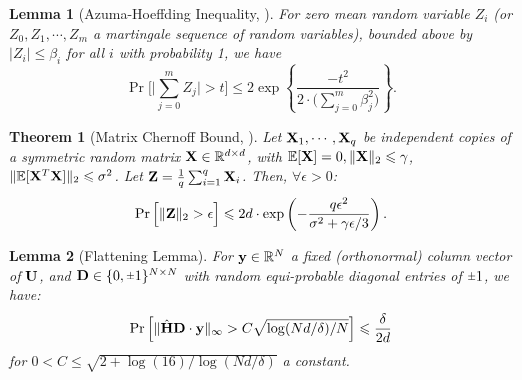 \documentclass[journal,letterpaper,onecolumn,twoside,nofonttune]{IEEEtran}
\newcommand{\Ub}{\bold{U}}
\newcommand{\Xb}{\bold{X}}
\newcommand{\yb}{\bold{y}}
\newcommand{\Zb}{\bold{Z}}
\newcommand{\R}{\mathbb{R}}
\newcommand{\E}{\mathbb{E}}
\newcommand{\Db}{\bold{D}}
\newcommand{\Hbh}{\hat{\bold{H}}}
\newcommand{\rpm}{\raisebox{.2ex}{$\scriptstyle\pm$}}
\newtheorem{Thm}{Theorem}
\newtheorem{Lemma}{Lemma}
\begin{document}
\begin{Lemma}[Azuma-Hoeffding Inequality, \cite{Mah16}]
\label{Az_Hoef_in}
For zero mean random variable $Z_i$ (or $Z_0,Z_1,\cdots,Z_m$ a martingale sequence of random variables), bounded above by $|Z_i|\leqslant \beta_i$ for all $i$ with probability 1, we have
$$ \Pr\bigg[\big|\sum_{j=0}^m Z_j\big|>t\bigg] \leqslant 2\exp\left\{\frac{-t^2}{2\cdot\big(\sum_{j=0}^m\beta_j^2\big)}\right\}. $$
\end{Lemma}

\begin{Thm}[Matrix Chernoff Bound, {\cite[Fact 1]{Woo14}}]
\label{matr_Chern}
  Let $\Xb_1,\cdots,\Xb_q$ be independent copies of a symmetric random matrix $\Xb\in\R^{d\times d}$, with $\E[\Xb]=0, \|\Xb\|_2\leqslant \gamma$, $\|\E[\Xb^T\Xb]\|_2\leqslant \sigma^2$. Let $\Zb=\frac{1}{q}\sum_{i=1}^q\Xb_i$. Then, $\forall\epsilon>0$:
  \begin{equation}
  \label{matr_Chern_expr}
    \Pr\Big[\|\Zb\|_2>\epsilon\Big]\leqslant2d\cdot\exp\left(-\frac{q\epsilon^2}{\sigma^2+\gamma\epsilon/3}\right).
  \end{equation}
\end{Thm}

\begin{Lemma}[Flattening Lemma]
\label{fl_lem}
  For $\yb\in\R^N$ a fixed (orthonormal) column vector of $\Ub$, and $\Db\in\{0,\rpm1\}^{N\times N}$ with random equi-probable diagonal entries of $\rpm1$, we have:
  \begin{equation}
  \label{flat_lem_id}
    \Pr\left[\|\Hbh\Db\cdot\yb\|_\infty> C\sqrt{\log(Nd/\delta)/N}\right]\leqslant\frac{\delta}{2d}
  \end{equation}
  for $0<C\leqslant \sqrt{2+\log(16)/\log(Nd/\delta)}$ a constant.
\end{Lemma}
\end{document}
